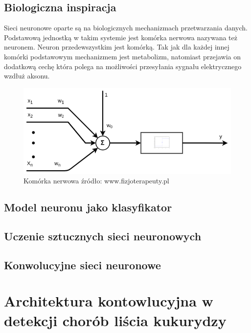 \documentclass{article}
\begin{document}
\subsection{Biologiczna inspiracja}
Sieci neuronowe oparte są na biologicznych mechanizmach przetwarzania danych. Podstawową jednostką
w takim systemie jest komórka nerwowa \cite{Tadeusiewicz1994} nazywana też neuronem.
Neuron przedewszystkim jest komórką. Tak jak dla każdej innej komórki podstawowym mechanizmem jest
metabolizm, natomiast przejawia on dodatkową cechę która polega na możliwości przesyłania sygnału
elektrycznego wzdłuż aksonu.
\begin{figure}[htb] 
	\label{fig:neuron}
	\centering
	\includegraphics[width=\textwidth]{figures/neuron}
	\caption{Komórka nerwowa \tiny{źródło: www.fizjoterapeuty.pl}}
\end{figure}

\FloatBarrier
\subsection{Model neuronu jako klasyfikator}

\subsection{Uczenie sztucznych sieci neuronowych}

\subsection{Konwolucyjne sieci neuronowe}


\section{Architektura kontowlucyjna w detekcji chorób liścia kukurydzy}

\nocite{*}
 
\end{document}
